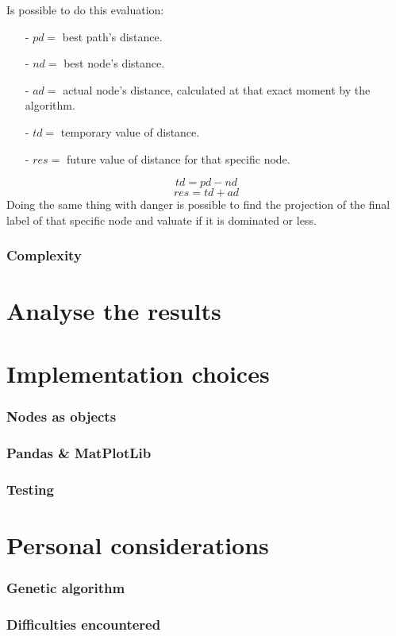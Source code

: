 \documentclass[a4paper,11pt]{report}
\begin{document}
Is possible to do this evaluation:
\begin{itemize}
	\item[-] $pd =$ best path's distance.
	\item[-] $nd =$ best node's distance.
	\item[-] $ad =$ actual node's distance, calculated at that exact moment by the algorithm.
	\item[-] $td =$ temporary value of distance.
	\item[-] $res =$ future value of distance for that specific node.
\end{itemize}
$$ td = pd - nd$$
$$res = td + ad$$
Doing the same thing with danger is possible to find the projection of the final label of that specific node and valuate if it is dominated or less.
\subsection{Complexity}

\chapter{Analyse the results}

\chapter{Implementation choices}
\subsection{Nodes as objects}
\subsection{Pandas \& MatPlotLib}
\subsection{Testing}

\chapter{Personal considerations}
\subsection{Genetic algorithm}
\subsection{Difficulties encountered}





\end{document}
